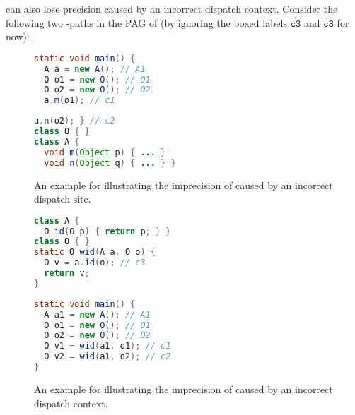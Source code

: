\LFC can also lose precision caused by an incorrect dispatch context.  
Consider the following two \LFC-paths in the PAG of 
(by ignoring  the boxed labels $\hat{\boxed{\texttt{c3}}}$ and $\check{\boxed{\texttt{c3}}}$ 
for now):


\begin{figure}
\begin{mdframed}[
align=center,
usetwoside=false,
 rightmargin=3cm,
innerleftmargin=1.0ex,
innerrightmargin=-20.0ex
innertopmargin=0.2ex,
innerbottommargin=0.2ex
]

\begin{minipage}{0.4\linewidth}
\begin{lstlisting}[language=java, basicstyle=\linespread{0.8}]
static void main() {
  A a = new A(); // A1
  O o1 = new O(); // O1
  O o2 = new O(); // O2
  a.m(o1); // c1
\end{lstlisting}
\end{minipage}
\hspace{-2ex}
\begin{minipage}{0.4\linewidth}
\begin{lstlisting}[language=java, firstnumber=6, basicstyle=\linespread{0.8}]
  a.n(o2); } // c2
class O { }
class A {
  void m(Object p) { ... }
  void n(Object q) { ... } }
\end{lstlisting}
\end{minipage}

\end{mdframed}
\caption{An example for illustrating the imprecision of \LFC caused by an
incorrect dispatch site.
    \label{fig:LFC-imprecision-callsite}}
\end{figure}



\begin{figure}
\begin{mdframed}[
align=center,
usetwoside=false,
rightmargin=3cm,
innerleftmargin=1.0ex,
innerrightmargin=-20.0ex
innertopmargin=0.2ex,
innerbottommargin=0.2ex
]

\begin{minipage}{0.4\linewidth}
\begin{lstlisting}[language=java, basicstyle=\linespread{0.8}]
class A {
  O id(O p) { return p; } }
class O { }
static O wid(A a, O o) {
  O v = a.id(o); // c3
  return v;
}
\end{lstlisting}
\end{minipage}
\hspace{-2ex}
\begin{minipage}{0.4\linewidth}
\begin{lstlisting}[language=java, firstnumber=8, basicstyle=\linespread{0.8}]
static void main() {
  A a1 = new A(); // A1
  O o1 = new O(); // O1
  O o2 = new O(); // O2
  O v1 = wid(a1, o1); // c1
  O v2 = wid(a1, o2); // c2
}
\end{lstlisting}
\end{minipage}
\end{mdframed}
\caption{An example for illustrating the imprecision of \LFC caused by an
incorrect dispatch context.
    \label{fig:LFC-imprecision-context}}
\end{figure}

